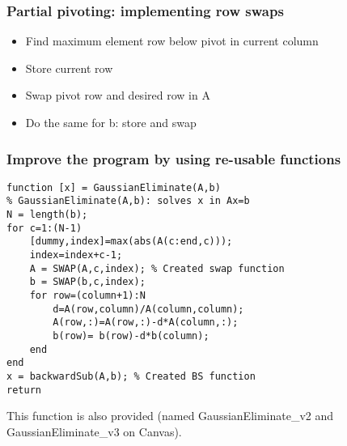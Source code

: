 \begin{frame}[fragile]
  \frametitle{Partial pivoting: implementing row swaps}
  \begin{itemize}
    \item<1->  Find maximum element row below pivot in current column
    \item<2->  Store current row
    \item<3-> Swap pivot row and desired row in A
    \item<4-> Do the same for b: store and swap
  \end{itemize}

\end{frame}

\begin{frame}[fragile]
  \frametitle{Improve the program by using re-usable functions}
  \begin{lstlisting}
function [x] = GaussianEliminate(A,b)
% GaussianEliminate(A,b): solves x in Ax=b
N = length(b);
for c=1:(N-1)
    [dummy,index]=max(abs(A(c:end,c)));
    index=index+c-1;
    A = SWAP(A,c,index); % Created swap function
    b = SWAP(b,c,index);
    for row=(column+1):N
        d=A(row,column)/A(column,column);
        A(row,:)=A(row,:)-d*A(column,:);
        b(row)= b(row)-d*b(column);
    end
end
x = backwardSub(A,b); % Created BS function
return
  \end{lstlisting}
  This function is also provided (named GaussianEliminate\_v2 and GaussianEliminate\_v3 on Canvas).
\end{frame}

